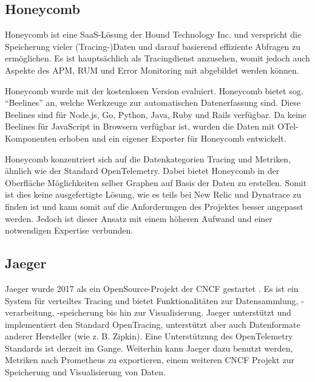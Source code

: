 \subsection{Honeycomb}

Honeycomb \cite{Honeycomb} ist eine SaaS-Lösung der Hound Technology Inc. und verspricht die Speicherung vieler (Tracing-)Daten und darauf basierend effiziente Abfragen zu ermöglichen. Es ist hauptsächlich als Tracingdienst anzusehen, womit jedoch auch Aspekte des APM, RUM und Error Monitoring mit abgebildet werden können.

Honeycomb wurde mit der kostenlosen Version evaluiert. Honeycomb bietet sog. \enquote{Beelines} an, welche Werkzeuge zur automatischen Datenerfassung sind. Diese Beelines sind für Node.js, Go, Python, Java, Ruby und Rails verfügbar. Da keine Beelines für JavaScript in Browsern verfügbar ist, wurden die Daten mit OTel-Komponenten erhoben und ein eigener Exporter für Honeycomb entwickelt.

Honeycomb konzentriert sich auf die Datenkategorien Tracing und Metriken, ähnlich wie der Standard OpenTelemetry. Dabei bietet Honeycomb in der Oberfläche Möglichkeiten selber Graphen auf Basis der Daten zu erstellen. Somit ist dies keine ausgefertigte Lösung, wie es teils bei New Relic und Dynatrace zu finden ist und kann somit auf die Anforderungen des Projektes besser angepasst werden. Jedoch ist dieser Ansatz mit einem höheren Aufwand und einer notwendigen Expertise verbunden.

\subsection{Jaeger}

Jaeger wurde 2017 als ein OpenSource-Projekt der CNCF gestartet \cite{Jaeger}. Es ist ein System für verteiltes Tracing und bietet Funktionalitäten zur Datensammlung, -verarbeitung, -speicherung bis hin zur Visualisierung. Jaeger unterstützt und implementiert den Standard OpenTracing, unterstützt aber auch Datenformate anderer Hersteller (wie z. B. Zipkin). Eine Unterstützung des OpenTelemetry Standards ist derzeit im Gange. Weiterhin kann Jaeger dazu benutzt werden, Metriken nach Prometheus \cite{Prometheus} zu exportieren, einem weiteren CNCF Projekt zur Speicherung und Visualisierung von Daten.

